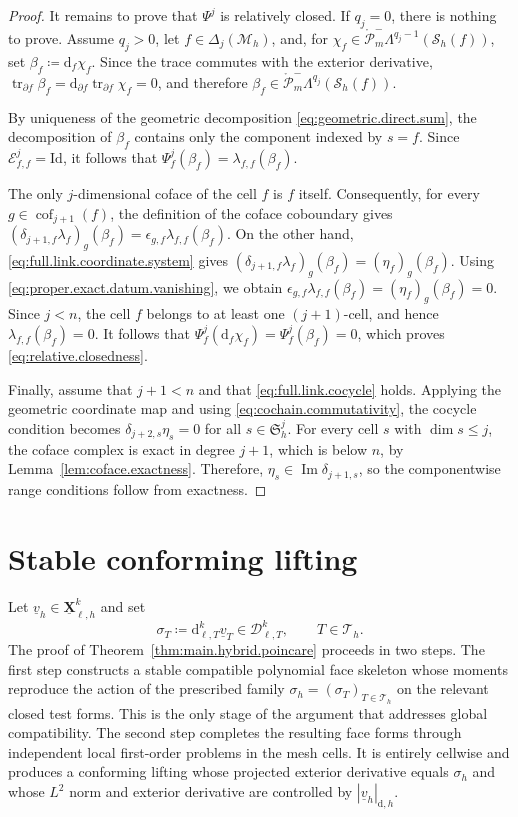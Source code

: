 \documentclass[a4paper,11pt]{article}
\theoremstyle{definition}
\newcommand{\DIFF}{\mathrm{d}}
\newcommand{\Mh}{\mathcal{M}_h}
\newcommand{\Sh}{\mathcal{S}_h}
\newcommand{\FM}[1]{\Delta_{#1}}
\newcommand{\cof}[1]{\operatorname{cof}_{#1}}
\newcommand{\uXh}[1]{\underline{\boldsymbol{X}}_{\ell,h}^{#1}}
\newcommand{\Dpoly}[2]{\mathcal D_{\ell,#1}^{#2}}
\newcommand{\trc}{\operatorname{tr}}
\newcommand{\PLtrimz}[2]{\mathring{\mathcal P}_{#1}^{-}\Lambda^{#2}}
\begin{document}
\begin{proof}
It remains to prove that $\Psi^j$ is relatively closed.
If $q_j=0$, there is nothing to prove.
Assume $q_j>0$, let $f\in\FM{j}(\Mh)$, and, for $\chi_f \in \PLtrimz{m}{q_j-1}(\Sh(f))$, set $\beta_f \coloneqq \DIFF_f\chi_f$.
Since the trace commutes with the exterior derivative, $\trc_{\partial f}\beta_f = \DIFF_{\partial f} \trc_{\partial f}\chi_f = 0$, and therefore $\beta_f \in \PLtrimz{m}{q_j}(\Sh(f))$.

By uniqueness of the geometric decomposition \eqref{eq:geometric.direct.sum}, the decomposition of $\beta_f$ contains only the component indexed by $s=f$.
Since $\mathcal E_{f,f}^j=\mathrm{Id}$, it follows that $\Psi_f^j(\beta_f) = \lambda_{f,f}(\beta_f)$.

The only $j$-dimensional coface of the cell $f$ is $f$ itself.
Consequently, for every $g\in\cof{j+1}(f)$, the definition of the coface coboundary gives $(\delta_{j+1,f}\lambda_f)_g(\beta_f) = \epsilon_{g,f}\lambda_{f,f}(\beta_f)$.
On the other hand, \eqref{eq:full.link.coordinate.system} gives $(\delta_{j+1,f}\lambda_f)_g(\beta_f) = (\eta_f)_g(\beta_f)$.
Using \eqref{eq:proper.exact.datum.vanishing}, we obtain $\epsilon_{g,f}\lambda_{f,f}(\beta_f) = (\eta_f)_g(\beta_f) = 0$.
Since $j<n$, the cell $f$ belongs to at least one $(j+1)$-cell, and hence $\lambda_{f,f}(\beta_f)=0$.
It follows that $\Psi_f^j(\DIFF_f\chi_f) = \Psi_f^j(\beta_f) = 0$, which proves \eqref{eq:relative.closedness}.

Finally, assume that $j+1<n$ and that \eqref{eq:full.link.cocycle} holds.
Applying the geometric coordinate map and using \eqref{eq:cochain.commutativity}, the cocycle condition becomes $\delta_{j+2,s}\eta_s=0$ for all $s\in\mathfrak S_h^j$.
For every cell $s$ with $\dim s\leq j$, the coface complex is exact in degree $j+1$, which is below $n$, by Lemma~\ref{lem:coface.exactness}.
Therefore, $\eta_s\in\operatorname{Im}\delta_{j+1,s}$, so the componentwise range conditions follow from exactness.
\end{proof}

\section{Stable conforming lifting}
\label{sec:poincare.proof}

Let $\underline v_h\in\uXh{k}$ and set
\begin{equation}\label{eq:prescribed.differential.data}
  \sigma_T
  \coloneqq
  \DIFF_{\ell,T}^{k}\underline v_T
  \in
  \Dpoly{T}{k},
  \qquad
  T\in\mathcal T_h.
\end{equation}
The proof of Theorem~\ref{thm:main.hybrid.poincare} proceeds in two steps.
The first step constructs a stable compatible polynomial face skeleton whose moments reproduce the action of the prescribed family $\sigma_h=(\sigma_T)_{T\in\mathcal T_h}$ on the relevant closed test forms.
This is the only stage of the argument that addresses global compatibility.
The second step completes the resulting face forms through independent local first-order problems in the mesh cells.
It is entirely cellwise and produces a conforming lifting whose projected exterior derivative equals $\sigma_h$ and whose $L^2$ norm and exterior derivative are controlled by $|\underline v_h|_{\DIFF,h}$.
\end{document}
